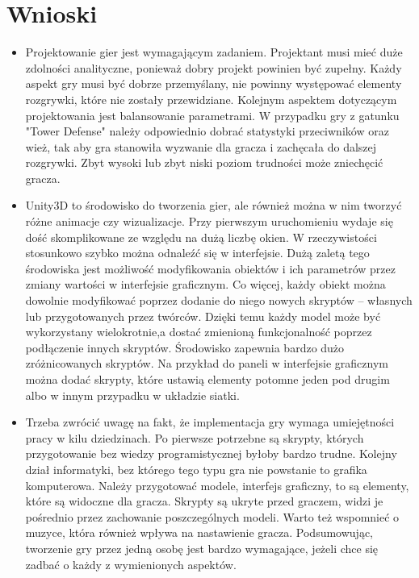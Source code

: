 \documentclass[a4paper,12pt, twoside, titlepage]{article}
\begin{document}
\section{Wnioski}
\begin{itemize}
	\item Projektowanie gier jest wymagającym zadaniem. Projektant musi mieć duże zdolności analityczne, ponieważ dobry projekt powinien być zupełny. Każdy aspekt gry musi być dobrze przemyślany, nie powinny występować elementy rozgrywki, które nie zostały przewidziane. Kolejnym aspektem dotyczącym projektowania jest balansowanie parametrami. W przypadku gry z gatunku "Tower Defense" należy odpowiednio dobrać statystyki przeciwników oraz wież, tak aby gra stanowiła wyzwanie dla gracza i zachęcała do dalszej rozgrywki. Zbyt wysoki lub zbyt niski poziom trudności może zniechęcić gracza.
	
	\item Unity3D to środowisko do tworzenia gier, ale również można w nim tworzyć różne animacje czy wizualizacje. Przy pierwszym uruchomieniu wydaje się dość skomplikowane ze względu na dużą liczbę okien. W rzeczywistości stosunkowo szybko można odnaleźć się w interfejsie. Dużą zaletą tego środowiska jest możliwość modyfikowania obiektów i ich parametrów przez zmiany wartości w interfejsie graficznym. Co więcej, każdy obiekt można dowolnie modyfikować poprzez dodanie do niego nowych skryptów -- własnych lub przygotowanych przez twórców. Dzięki temu każdy model może być wykorzystany wielokrotnie,a dostać zmienioną funkcjonalność poprzez podłączenie innych skryptów. Środowisko zapewnia bardzo dużo zróżnicowanych skryptów. Na przykład do paneli w interfejsie graficznym można dodać skrypty, które ustawią elementy potomne jeden pod drugim albo w innym przypadku w układzie siatki.
	
	\item Trzeba zwrócić uwagę na fakt, że implementacja gry wymaga umiejętności pracy w kilu dziedzinach. Po pierwsze potrzebne są skrypty, których przygotowanie bez wiedzy programistycznej byłoby bardzo trudne. Kolejny dział informatyki, bez którego tego typu gra nie powstanie to grafika komputerowa. Należy przygotować modele, interfejs graficzny, to są elementy, które są widoczne dla gracza. Skrypty są ukryte przed graczem, widzi je pośrednio przez zachowanie poszczególnych modeli. Warto też wspomnieć o muzyce, która również wpływa na nastawienie gracza. Podsumowując, tworzenie gry przez jedną osobę jest bardzo wymagające, jeżeli chce się zadbać o każdy z wymienionych aspektów.
	

\end{itemize}
\end{document}
